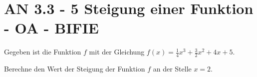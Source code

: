 \section{AN 3.3 - 5 Steigung einer Funktion - OA - BIFIE}

\begin{beispiel}[AN 3.3]{1} %
				Gegeben ist die Funktion $f$ mit der Gleichung $f(x)=\frac{1}{4}x^3+\frac{3}{2}x^2+4x+5$.

Berechne den Wert der Steigung der Funktion $f$ an der Stelle $x=2$.
\leer

\end{beispiel}